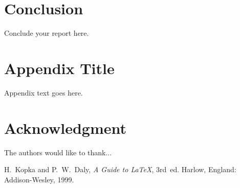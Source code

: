 \documentclass[journal,11pt]{IEEEtran}
\begin{document}
\section{Conclusion}
Conclude your report here.

\appendices
\section{Appendix Title}
Appendix text goes here.

\section*{Acknowledgment}
The authors would like to thank...

\begin{thebibliography}{1}

H.~Kopka and P.~W.~Daly, \emph{A Guide to \LaTeX}, 3rd~ed. Harlow, England: Addison-Wesley, 1999.

\end{thebibliography}
\end{document}
